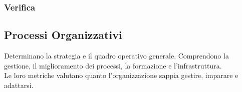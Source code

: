 \subsubsection{Verifica}\vspace{-0.2cm}
\begin{table}[h]
    \centering
    \renewcommand{\arraystretch}{1.15}
    \vspace{-0.3cm}
    \caption{Processi di supporto - Metriche del processo di verifica}
\end{table}

\subsection{Processi Organizzativi}
Determinano la strategia e il quadro operativo generale. Comprendono la gestione, il miglioramento dei processi, la formazione e l'infrastruttura.\\
Le loro metriche valutano quanto l'organizzazione sappia gestire, imparare e adattarsi.\\
\begin{table}[h]
    \centering
    \renewcommand{\arraystretch}{1.15}
    \vspace{-0.3cm}
    \caption{Processi organizzativi}
\end{table}